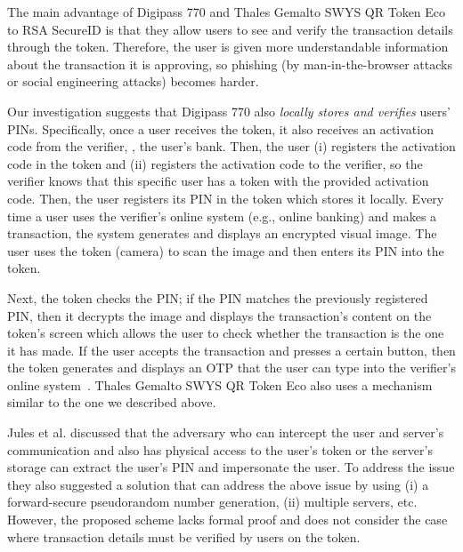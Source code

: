 The main advantage of  Digipass 770 and Thales Gemalto SWYS QR Token Eco to RSA SecureID is that they allow users to see and verify the transaction details through the token. Therefore, the user is given more understandable information about the transaction it is approving,
so phishing (by man-in-the-browser attacks or social engineering attacks) becomes harder. 

 

Our investigation suggests that Digipass 770 also \emph{locally stores and verifies} users' PINs. 
%
Specifically, once a user receives the token, it also receives an activation code from the verifier, \eg, the user's bank.  Then, the user (i) registers the activation code in the token and (ii) registers the activation code to the verifier, so the verifier knows that this specific user has a token with the provided activation code. Then, the user registers its PIN in the token which stores it locally. Every time a user uses the verifier's online system  (e.g., online banking) and makes a transaction, the system generates and displays an encrypted visual image. The user uses the token (camera) to scan the image and then enters its PIN into the token. 

Next, the token checks the PIN; if the PIN matches the previously registered PIN, then it decrypts the image and displays the transaction's content on the token's screen which allows the user to check whether the transaction is the one it has made. If the user accepts the transaction and presses a certain button, then the token generates and displays an OTP that the user can type into the verifier's online system~\cite{Digipass-website}.  Thales Gemalto SWYS QR Token Eco also uses a mechanism similar to the one we described above. 


Jules et al. \cite{juels2016configurable} discussed that the adversary who can intercept the user and server's communication and also has physical access to the user's token or the server's storage can extract the user's PIN and impersonate the user. To address the issue they also suggested a solution that can address the above issue by using (i) a forward-secure pseudorandom number generation, (ii) multiple servers, etc. However, the proposed scheme lacks formal proof and does not consider the case where transaction details must be verified by users on the token.  

